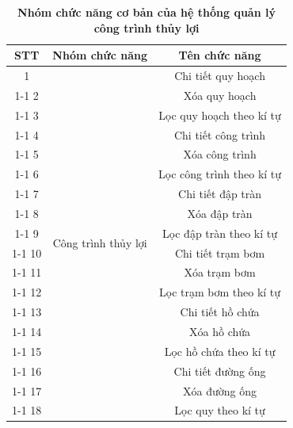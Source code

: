 \documentclass{article} %
\begin{document}
\begin{table}[H]
    \centering
    
    \caption[Nhóm chức năng của hệ thống]{\bfseries\fontsize{12pt}{0pt}\selectfont Nhóm chức năng cơ bản của hệ thống quản lý công trình thủy lợi}
    \begin{tabular}{|c|c|c|}
    \hline
    STT & Nhóm chức năng                        & Tên chức năng               \\ \hline
    1   & \multirow{18}{*}{Công trình thủy lợi} & Chi tiết quy hoạch          \\ \cline{1-1} \cline{3-3} 
    2   &                                       & Xóa quy hoạch               \\ \cline{1-1} \cline{3-3} 
    3   &                                       & Lọc quy  hoạch theo kí   tự \\ \cline{1-1} \cline{3-3} 
    4   &                                       & Chi tiết công trình         \\ \cline{1-1} \cline{3-3} 
    5   &                                       & Xóa công trình              \\ \cline{1-1} \cline{3-3} 
    6   &                                       & Lọc công trình theo kí tự   \\ \cline{1-1} \cline{3-3} 
    7   &                                       & Chi tiết đập tràn           \\ \cline{1-1} \cline{3-3} 
    8   &                                       & Xóa đập tràn                \\ \cline{1-1} \cline{3-3} 
    9   &                                       & Lọc đập tràn theo kí tự     \\ \cline{1-1} \cline{3-3} 
    10  &                                       & Chi tiết trạm bơm           \\ \cline{1-1} \cline{3-3} 
    11  &                                       & Xóa trạm bơm                \\ \cline{1-1} \cline{3-3} 
    12  &                                       & Lọc trạm bơm theo kí tự     \\ \cline{1-1} \cline{3-3} 
    13  &                                       & Chi tiết hồ chứa            \\ \cline{1-1} \cline{3-3} 
    14  &                                       & Xóa hồ chứa                 \\ \cline{1-1} \cline{3-3} 
    15  &                                       & Lọc hồ chứa theo kí tự      \\ \cline{1-1} \cline{3-3} 
    16  &                                       & Chi tiết đường  ống         \\ \cline{1-1} \cline{3-3} 
    17  &                                       & Xóa đường ống               \\ \cline{1-1} \cline{3-3} 
    18  &                                       & Lọc quy theo kí tự          \\ \hline
    \end{tabular}
    \label{tab:hethong}
\end{table}
\end{document}
